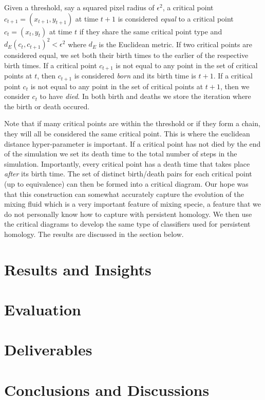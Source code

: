 \documentclass[12pt, fullpage,letterpaper]{article}
\theoremstyle{definition}
\begin{document}
	Given a threshold, say a squared pixel radius of $\epsilon^2$, a critical point $c_{t + 1} = (x_{t + 1}, y_{t + 1} )$ at time $t + 1$ is considered \emph{equal} to a critical point $c_t = (x_t, y_t)$ at time $t$ if they share the same critical point type and $d_E(c_t, c_{t + 1})^2 < \epsilon^2$ where $d_E$ is the Euclidean metric. If two critical points are considered equal, we set both their birth times to the earlier of the respective birth times. If a critical point $c_{t + 1}$ is not equal to any point in the set of critical points at $t$, then $c_{t + 1}$ is considered \emph{born} and its birth time is $t + 1$. If a critical point $c_t$ is not equal to any point in the set of critical points at $t + 1$, then we consider $c_t$ to have \emph{died}. In both birth and deaths we store the iteration where the birth or death occured. 
	
	Note that if many critical points are within the threshold or if they form a chain, they will all be considered the same critical point. This is where the euclidean distance hyper-parameter is important. If a critical point has not died by the end of the simulation we set its death time to the total number of steps in the simulation. Importantly, every critical point has a death time that takes place \emph{after} its birth time. The set of distinct birth/death pairs for each critical point (up to equivalence) can then be formed into a critical diagram. Our hope was that this construction can somewhat accurately capture the evolution of the mixing fluid which is a very important feature of mixing specie, a feature that we do not personally know how to capture with persistent homology. We then use the critical diagrams to develop the same type of classifiers used for persistent homology. The results are discussed in the section below.
	
	\section*{\normalfont Results and Insights}
	\section*{\normalfont Evaluation}
	\section*{\normalfont Deliverables} 
	\section*{\normalfont Conclusions and Discussions}
	
\end{document}
